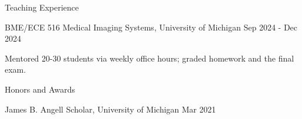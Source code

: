 \documentclass{resume}
\begin{document}
\begin{rSection}{Teaching Experience}
    \begin{rSubsection}{BME/ECE 516 Medical Imaging Systems}{, University of Michigan \hfill {Sep 2024 - Dec 2024}}
        \item[$\bullet$] Mentored 20-30 students via weekly office hours; graded homework and the final exam.
    \end{rSubsection}
\end{rSection}

\begin{rSection}{Honors and Awards}
	\begin{rSubsection}{James B. Angell Scholar}{, University of Michigan \hfill Mar 2021}
	\end{rSubsection}
\end{rSection}
\end{document}
